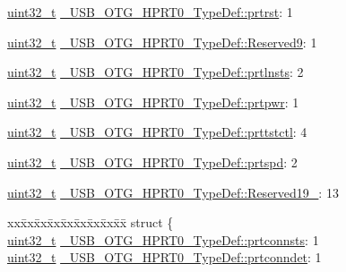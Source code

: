 \begin{DoxyCompactItemize}
\item 
\hyperlink{stdint_8h_a435d1572bf3f880d55459d9805097f62}{uint32\-\_\-t} \hyperlink{group___u_s_b___o_t_g___d_r_i_v_e_r_ga4511b9044f1fa4b5fb1127e8bc723bbf}{\-\_\-\-U\-S\-B\-\_\-\-O\-T\-G\-\_\-\-H\-P\-R\-T0\-\_\-\-Type\-Def\-::prtrst}\-: 1
\item 
\hyperlink{stdint_8h_a435d1572bf3f880d55459d9805097f62}{uint32\-\_\-t} \hyperlink{group___u_s_b___o_t_g___d_r_i_v_e_r_gaaea15a924b1b3e769dabc7cfcab7294f}{\-\_\-\-U\-S\-B\-\_\-\-O\-T\-G\-\_\-\-H\-P\-R\-T0\-\_\-\-Type\-Def\-::\-Reserved9}\-: 1
\item 
\hyperlink{stdint_8h_a435d1572bf3f880d55459d9805097f62}{uint32\-\_\-t} \hyperlink{group___u_s_b___o_t_g___d_r_i_v_e_r_ga1eb1bfa9b25d1d632b5a744db9fcc7e5}{\-\_\-\-U\-S\-B\-\_\-\-O\-T\-G\-\_\-\-H\-P\-R\-T0\-\_\-\-Type\-Def\-::prtlnsts}\-: 2
\item 
\hyperlink{stdint_8h_a435d1572bf3f880d55459d9805097f62}{uint32\-\_\-t} \hyperlink{group___u_s_b___o_t_g___d_r_i_v_e_r_gab6199aadb1043eb15c2814bf6985fefb}{\-\_\-\-U\-S\-B\-\_\-\-O\-T\-G\-\_\-\-H\-P\-R\-T0\-\_\-\-Type\-Def\-::prtpwr}\-: 1
\item 
\hyperlink{stdint_8h_a435d1572bf3f880d55459d9805097f62}{uint32\-\_\-t} \hyperlink{group___u_s_b___o_t_g___d_r_i_v_e_r_gaa103b41b4bc60256a25f3c9cd541f2fc}{\-\_\-\-U\-S\-B\-\_\-\-O\-T\-G\-\_\-\-H\-P\-R\-T0\-\_\-\-Type\-Def\-::prttstctl}\-: 4
\item 
\hyperlink{stdint_8h_a435d1572bf3f880d55459d9805097f62}{uint32\-\_\-t} \hyperlink{group___u_s_b___o_t_g___d_r_i_v_e_r_gac4a7f33605ec1bf4c6d9bf5127dfd6b4}{\-\_\-\-U\-S\-B\-\_\-\-O\-T\-G\-\_\-\-H\-P\-R\-T0\-\_\-\-Type\-Def\-::prtspd}\-: 2
\item 
\hyperlink{stdint_8h_a435d1572bf3f880d55459d9805097f62}{uint32\-\_\-t} \hyperlink{group___u_s_b___o_t_g___d_r_i_v_e_r_ga985d93249d26d1bba1e829f325c55a40}{\-\_\-\-U\-S\-B\-\_\-\-O\-T\-G\-\_\-\-H\-P\-R\-T0\-\_\-\-Type\-Def\-::\-Reserved19\-\_}\-: 13
\item 
\begin{tabbing}
xx\=xx\=xx\=xx\=xx\=xx\=xx\=xx\=xx\=\kill
struct \{\\
\>\hyperlink{stdint_8h_a435d1572bf3f880d55459d9805097f62}{uint32\_t} \hyperlink{group___u_s_b___o_t_g___d_r_i_v_e_r_ga80c85f29776c859b982bffa2d57a61c0}{\_USB\_OTG\_HPRT0\_TypeDef::prtconnsts}: 1\\
\>\hyperlink{stdint_8h_a435d1572bf3f880d55459d9805097f62}{uint32\_t} \hyperlink{group___u_s_b___o_t_g___d_r_i_v_e_r_ga7c3212cf708588fcd8823f2fe4c171af}{\_USB\_OTG\_HPRT0\_TypeDef::prtconndet}: 1\\

\end{tabbing}
\end{DoxyCompactItemize}
